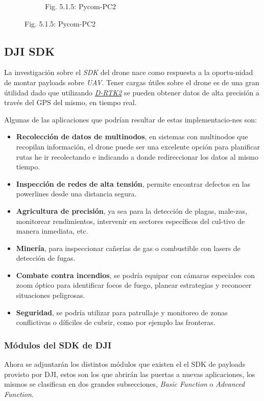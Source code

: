 \documentclass[12pt]{article}
\begin{document}
\begin{figure}[ht]
\begin{subfigure}[c]{0.35\linewidth}
    \caption{Fig. 5.1.5: Pycom-PC2}
  \end{subfigure}
\end{figure}
\FloatBarrier
\subsection{DJI SDK}
La investigación sobre el \textit{SDK} del drone nace como respuesta a la oportu-nidad de montar payloads sobre \textit{UAV}. Tener cargas útiles sobre el drone es de una gran útilidad dado que utilizando \href{https://www.dji.com/d-rtk-2}{\textit{D-RTK2}} \cite{rtk} se pueden obtener datos de alta precisión a través del GPS del mismo, en tiempo real.

Algunas de las aplicaciones que podrían resultar de estas implementacio-nes son:
\begin{itemize}
  \item \textbf{Recolección de datos de multinodos}, en sistemas con multinodos que recopilan información, el drone puede ser una excelente opción para planificar rutas he ir recolectando e indicando a donde redireccionar los datos al mismo tiempo.
  \item \textbf{Inspección de redes de alta tensión}, permite encontrar defectos en las powerlines desde una distancia segura.
  \item \textbf{Agricultura de precisión}, ya sea para la detección de plagas, male-zas, monitorear rendimientos, intervenir en sectores específicos del cul-tivo de manera inmediata, etc.
  \item \textbf{Minería}, para inspeccionar cañerías de gas o combustible con lasers de detección de fugas.
  \item \textbf{Combate contra incendios}, se podría equipar con cámaras especiales con zoom óptico para identificar focos de fuego, planear estrategias y reconocer situaciones peligrosas.
  \item \textbf{Seguridad}, se podría utilizar para patrullaje y monitoreo de zonas conflictivas o díficiles de cubrir, como por ejemplo las fronteras.
\end{itemize}

\subsubsection{Módulos del SDK de DJI}
Ahora se adjuntarán los distintos módulos que existen el el SDK de payloads provisto por DJI, estos son los que abrirán las puertas a nuevas aplicaciones, los mismos se clasifican en dos grandes subsecciones, \textit{Basic Function} o \textit{Advanced Function}.
\end{document}
